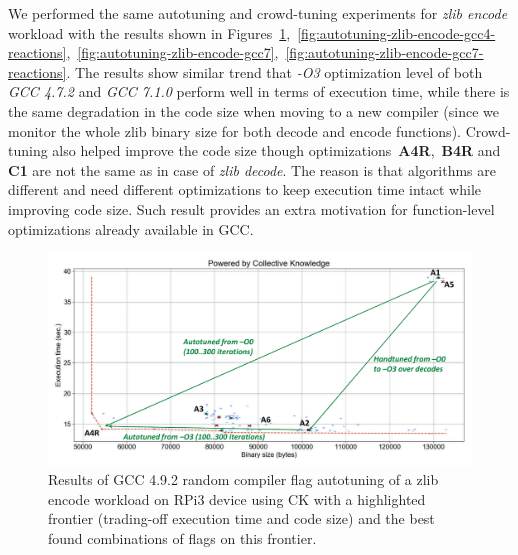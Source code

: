 We performed the same autotuning and crowd-tuning experiments for \textit{zlib encode} workload
with the results shown in Figures~\ref{fig:autotuning-zlib-encode-gcc4},~\ref{fig:autotuning-zlib-encode-gcc4-reactions},~\ref{fig:autotuning-zlib-encode-gcc7},~\ref{fig:autotuning-zlib-encode-gcc7-reactions}.
%
The results show similar trend that \textit{-O3} optimization level of both \textit{GCC 4.7.2} and \textit{GCC 7.1.0} 
perform well in terms of execution time, while there is the same degradation in the code size when moving to a new compiler
(since we monitor the whole zlib binary size for both decode and encode functions).
%
Crowd-tuning also helped improve the code size though optimizations~\textbf{A4R},~\textbf{B4R} and \textbf{C1}
are not the same as in case of \textit{zlib decode}.
%
The reason is that algorithms are different and need different optimizations 
to keep execution time intact while improving code size.
%
Such result provides an extra motivation for function-level optimizations
already available in GCC.

   \begin{figure}[!htbp]
     \centering
      \includegraphics[width=5.2in]
      {ck-assets/269da4a48ecdfe46-cropped.pdf} %
      \vspace{0.1in}
      \vspace{0.1in}
     \caption{
      Results of GCC 4.9.2 random compiler flag autotuning of a zlib encode workload on RPi3
      device using CK with a highlighted frontier (trading-off execution time and code size) 
      and the best found combinations of flags on this frontier.
     }
     \label{fig:autotuning-zlib-encode-gcc4}
   \end{figure}

